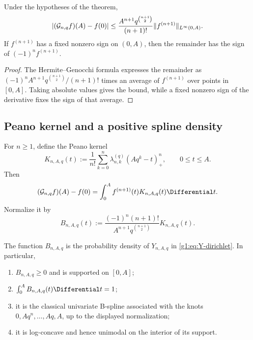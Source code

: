 \begin{corollary}
Under the hypotheses of the theorem,
\begin{equation}
 |(\mathcal G_{n,q}f)(A)-f(0)|
 \le\frac{A^{n+1}q^{\binom{n+1}{2}}}{(n+1)!}
 \|f^{(n+1)}\|_{L^\infty(0,A)}.
 \label{g1:eq:smooth-bound}
\end{equation}
If $f^{(n+1)}$ has a fixed nonzero sign on $(0,A)$, then the remainder has the
sign of $(-1)^nf^{(n+1)}$.
\end{corollary}

\begin{proof}
The Hermite--Genocchi formula expresses the remainder as
$(-1)^nA^{n+1}q^{\binom{n+1}{2}}/(n+1)!$ times an average of
$f^{(n+1)}$ over points in $[0,A]$.  Taking absolute values gives the
bound, while a fixed nonzero sign of the derivative fixes the sign of
that average.
\end{proof}

\subsection{Peano kernel and a positive spline density}

For $n\ge1$, define the Peano kernel
\begin{equation}
 K_{n,A,q}(t):=\frac1{n!}\sum_{k=0}^n
 \lambda_{n,k}^{(q)}(Aq^k-t)_+^n,
 \qquad 0\le t\le A.
 \label{g1:eq:Peano-kernel}
\end{equation}
Then
\[
 (\Gc_{n,q}f)(A)-f(0)=\int_0^Af^{(n+1)}(t)K_{n,A,q}(t)\Differential t.
\]
Normalize it by
\begin{equation}
 B_{n,A,q}(t):=
 \frac{(-1)^n(n+1)!}{A^{n+1}q^{\binom{n+1}{2}}}K_{n,A,q}(t).
 \label{g1:eq:B-density}
\end{equation}

\begin{theorem}
The function $B_{n,A,q}$ is the probability density of
$Y_{n,A,q}$ in \eqref{g1:eq:Y-dirichlet}.  In particular,
\begin{enumerate}[label=(\roman*),leftmargin=2em]
\item $B_{n,A,q}\ge0$ and is supported on $[0,A]$;
\item $\int_0^AB_{n,A,q}(t)\Differential t=1$;
\item it is the classical univariate B-spline associated with the knots
$0,Aq^n,\ldots,Aq,A$, up to the displayed normalization;
\item it is log-concave and hence unimodal on the interior of its support.
\end{enumerate}
\end{theorem}

